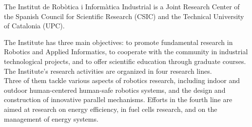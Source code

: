 The Institut de Robòtica i Informàtica Industrial is a Joint Research Center of the Spanish Council for Scientific Research (CSIC) and the Technical University of Catalonia (UPC).

 The Institute has three main objectives: to promote fundamental research in Robotics and Applied Informatics, to cooperate with the community in industrial technological projects, and to offer scientific education through graduate courses.
The Institute's research activities are organized in four research lines.\\

Three of them tackle various aspects of robotics research, including indoor and outdoor human-centered human-safe robotics systems, and the design and construction of innovative parallel mechanisms.
Efforts in the fourth line are aimed at research on energy efficiency, in fuel cells research, and on the management of energy systems.
